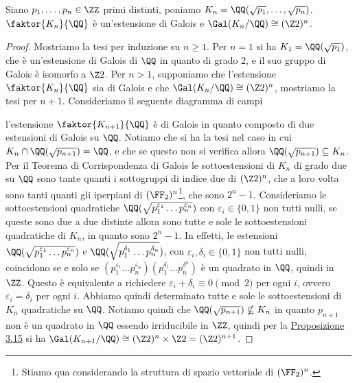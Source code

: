 \documentclass[11pt]{scrartcl}
\begin{document}
	\begin{theorem}
		Siano $p_1, \ldots, p_n \in \ZZ$ primi distinti, poniamo $K_n = 
		\QQ(\sqrt{p_1}, \ldots, \sqrt{p_n})$. $\faktor{K_n}{\QQ}$ è un'estensione
		di Galois e $\Gal(K_n/\QQ) \cong (\Z2)^n$.
	\end{theorem}
	
	\begin{proof}
		Mostriamo la tesi per induzione su $n \geq 1$. Per $n = 1$ si ha $K_1 = \QQ(\sqrt{p_1})$,
		che è un'estensione di Galois di $\QQ$ in quanto di grado 2, e il suo 
		gruppo di Galois è isomorfo a $\Z2$. Per $n > 1$, supponiamo che l'estensione
		$\faktor{K_n}{\QQ}$ sia di Galois e che $\Gal(K_n/\QQ) \cong (\Z2)^n$, 
		mostriamo la tesi per $n + 1$. Consideriamo il seguente diagramma di campi
		\begin{center}
		\end{center}
		l'estensione $\faktor{K_{n + 1}}{\QQ}$ è di Galois in quanto composto
		di due estensioni di Galois su $\QQ$. Notiamo che si ha la tesi nel caso 
		in cui $K_n \cap \QQ(\sqrt{p_{n + 1}}) = \QQ$, e che se questo non si 
		verifica allora $\QQ(\sqrt{p_{n + 1}}) \subseteq K_n$. Per il Teorema di 
		Corrispondenza di Galois le sottoestensioni di $K_n$ di grado due su 
		$\QQ$ sono tante quanti i sottogruppi di indice due di $(\Z2)^n$, che a 
		loro volta sono tanti quanti gli iperpiani di $(\FF_2)^n$\footnote{
			Stiamo qua considerando la struttura di spazio vettoriale di $(\FF_2)^n$.
		}, che sono $2^n - 1$.
		Consideriamo le sottoestensioni quadratiche 
		$\QQ(\sqrt{p_1^{\varepsilon_1}\ldots p_n^{\varepsilon_n}})$ con $\varepsilon_i \in \{0, 1\}$
		non tutti nulli, se queste sono due a due distinte allora sono tutte e sole
		le sottoestensioni quadratiche di $K_n$, in quanto sono $2^n - 1$. In effetti,
		le estensioni $\QQ(\sqrt{p_1^{\varepsilon_1}\ldots p_n^{\varepsilon_n}})$ e
		$\QQ(\sqrt{p_1^{\delta_1}\ldots p_n^{\delta_n}})$, con 
		$\varepsilon_i, \delta_i \in \{0, 1\}$ non tutti nulli, coincidono se e solo se 
		$(p_1^{\varepsilon_1}\ldots p_n^{\varepsilon_n})(p_1^{\delta_1}\ldots p_n^{\delta^n})$
		è un quadrato in $\QQ$, quindi in $\ZZ$. Questo è equivalente a richiedere
		$\varepsilon_i + \delta_i \equiv 0 \pmod 2$ per ogni $i$, ovvero 
		$\varepsilon_i = \delta_i$ per ogni $i$. Abbiamo quindi determinato tutte 
		e sole le sottoestensioni di $K_n$ quadratiche su $\QQ$. Notiamo quindi 
		che $\QQ(\sqrt{p_{n + 1}}) \nsubseteq K_n$ in quanto $p_{n + 1}$ non è 
		un quadrato in $\QQ$ essendo irriducibile in $\ZZ$, quindi per la 
		\hyperref[prop3.15]{Proposizione 3.15} si ha $\Gal(K_{n + 1}/\QQ) \cong
		(\Z2)^n\times \Z2 = (\Z2)^{n + 1}$.
	\end{proof}
	
\end{document}
